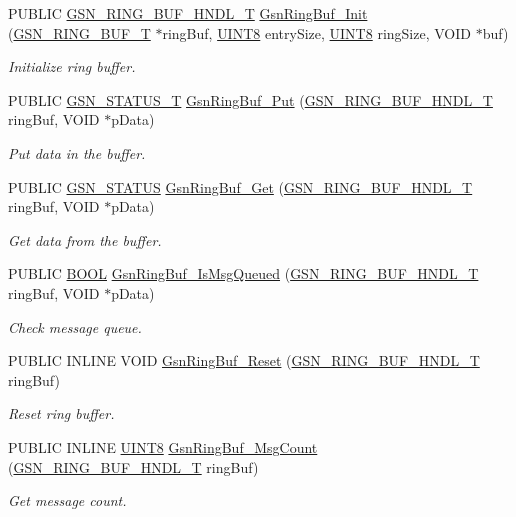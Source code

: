 \begin{DoxyCompactItemize}
\item 
PUBLIC \hyperlink{a00191}{GSN\_\-RING\_\-BUF\_\-HNDL\_\-T} \hyperlink{a00632_ga5a3a10cb80523bff48cbf73776e47864}{GsnRingBuf\_\-Init} (\hyperlink{a00191}{GSN\_\-RING\_\-BUF\_\-T} $\ast$ringBuf, \hyperlink{a00660_gab27e9918b538ce9d8ca692479b375b6a}{UINT8} entrySize, \hyperlink{a00660_gab27e9918b538ce9d8ca692479b375b6a}{UINT8} ringSize, VOID $\ast$buf)
\begin{DoxyCompactList}\small\item\em Initialize ring buffer. \end{DoxyCompactList}\item 
PUBLIC \hyperlink{a00659_gae36517c0f5872426a7034c9551eb96ac}{GSN\_\-STATUS\_\-T} \hyperlink{a00632_ga4a6b45d6cdeafb52618c83f7e4493248}{GsnRingBuf\_\-Put} (\hyperlink{a00191}{GSN\_\-RING\_\-BUF\_\-HNDL\_\-T} ringBuf, VOID $\ast$pData)
\begin{DoxyCompactList}\small\item\em Put data in the buffer. \end{DoxyCompactList}\item 
PUBLIC \hyperlink{a00660_gada5951904ac6110b1fa95e51a9ddc217}{GSN\_\-STATUS} \hyperlink{a00632_gab599ebf3ae090c745e3e027fedf8ed3e}{GsnRingBuf\_\-Get} (\hyperlink{a00191}{GSN\_\-RING\_\-BUF\_\-HNDL\_\-T} ringBuf, VOID $\ast$pData)
\begin{DoxyCompactList}\small\item\em Get data from the buffer. \end{DoxyCompactList}\item 
PUBLIC \hyperlink{a00660_ga1f04022c0a182c51c059438790ea138c}{BOOL} \hyperlink{a00632_ga39019b55b74ef1ef4d385a40d347e96e}{GsnRingBuf\_\-IsMsgQueued} (\hyperlink{a00191}{GSN\_\-RING\_\-BUF\_\-HNDL\_\-T} ringBuf, VOID $\ast$pData)
\begin{DoxyCompactList}\small\item\em Check message queue. \end{DoxyCompactList}\item 
PUBLIC INLINE VOID \hyperlink{a00632_ga28df066aa6f2af6fc0d50fb4402de208}{GsnRingBuf\_\-Reset} (\hyperlink{a00191}{GSN\_\-RING\_\-BUF\_\-HNDL\_\-T} ringBuf)
\begin{DoxyCompactList}\small\item\em Reset ring buffer. \end{DoxyCompactList}\item 
PUBLIC INLINE \hyperlink{a00660_gab27e9918b538ce9d8ca692479b375b6a}{UINT8} \hyperlink{a00632_ga03d18f6d7018fa9b86172970abab664b}{GsnRingBuf\_\-MsgCount} (\hyperlink{a00191}{GSN\_\-RING\_\-BUF\_\-HNDL\_\-T} ringBuf)
\begin{DoxyCompactList}\small\item\em Get message count. \end{DoxyCompactList}\end{DoxyCompactItemize}


